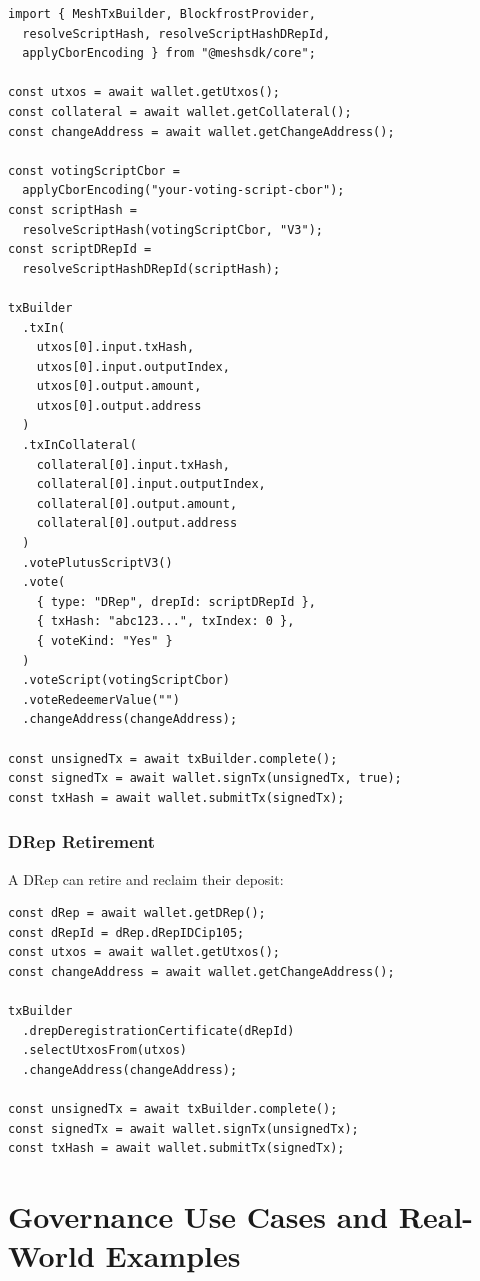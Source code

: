 \begin{lstlisting}[caption=Voting with a Plutus V3 Script]
import { MeshTxBuilder, BlockfrostProvider,
  resolveScriptHash, resolveScriptHashDRepId,
  applyCborEncoding } from "@meshsdk/core";

const utxos = await wallet.getUtxos();
const collateral = await wallet.getCollateral();
const changeAddress = await wallet.getChangeAddress();

const votingScriptCbor =
  applyCborEncoding("your-voting-script-cbor");
const scriptHash =
  resolveScriptHash(votingScriptCbor, "V3");
const scriptDRepId =
  resolveScriptHashDRepId(scriptHash);

txBuilder
  .txIn(
    utxos[0].input.txHash,
    utxos[0].input.outputIndex,
    utxos[0].output.amount,
    utxos[0].output.address
  )
  .txInCollateral(
    collateral[0].input.txHash,
    collateral[0].input.outputIndex,
    collateral[0].output.amount,
    collateral[0].output.address
  )
  .votePlutusScriptV3()
  .vote(
    { type: "DRep", drepId: scriptDRepId },
    { txHash: "abc123...", txIndex: 0 },
    { voteKind: "Yes" }
  )
  .voteScript(votingScriptCbor)
  .voteRedeemerValue("")
  .changeAddress(changeAddress);

const unsignedTx = await txBuilder.complete();
const signedTx = await wallet.signTx(unsignedTx, true);
const txHash = await wallet.submitTx(signedTx);
\end{lstlisting}

\subsubsection{DRep Retirement}

A DRep can retire and reclaim their deposit:

\begin{lstlisting}[caption=Retiring as a DRep]
const dRep = await wallet.getDRep();
const dRepId = dRep.dRepIDCip105;
const utxos = await wallet.getUtxos();
const changeAddress = await wallet.getChangeAddress();

txBuilder
  .drepDeregistrationCertificate(dRepId)
  .selectUtxosFrom(utxos)
  .changeAddress(changeAddress);

const unsignedTx = await txBuilder.complete();
const signedTx = await wallet.signTx(unsignedTx);
const txHash = await wallet.submitTx(signedTx);
\end{lstlisting}


\section{Governance Use Cases and Real-World Examples} \label{sec:governance-use-cases}

